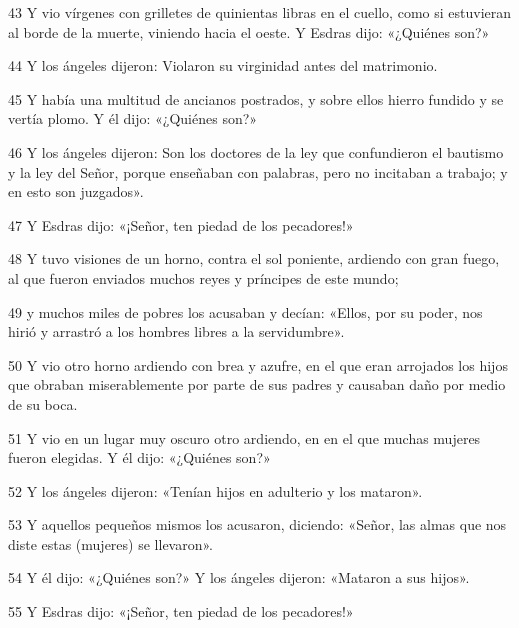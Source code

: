\par 43 Y vio vírgenes con grilletes de quinientas libras en el cuello, como si estuvieran al borde de la muerte, viniendo hacia el oeste. Y Esdras dijo: «¿Quiénes son?»

\par 44 Y los ángeles dijeron: Violaron su virginidad antes del matrimonio.

\par 45 Y había una multitud de ancianos postrados, y sobre ellos hierro fundido y se vertía plomo. Y él dijo: «¿Quiénes son?»

\par 46 Y los ángeles dijeron: Son los doctores de la ley que confundieron el bautismo y la ley del Señor, porque enseñaban con palabras, pero no incitaban a trabajo; y en esto son juzgados».

\par 47 Y Esdras dijo: «¡Señor, ten piedad de los pecadores!»

\par 48 Y tuvo visiones de un horno, contra el sol poniente, ardiendo con gran fuego, al que fueron enviados muchos reyes y príncipes de este mundo;

\par 49 y muchos miles de pobres los acusaban y decían: «Ellos, por su poder, nos hirió y arrastró a los hombres libres a la servidumbre».

\par 50 Y vio otro horno ardiendo con brea y azufre, en el que eran arrojados los hijos que obraban miserablemente por parte de sus padres y causaban daño por medio de su boca.

\par 51 Y vio en un lugar muy oscuro otro ardiendo, en en el que muchas mujeres fueron elegidas. Y él dijo: «¿Quiénes son?»

\par 52 Y los ángeles dijeron: «Tenían hijos en adulterio y los mataron».

\par 53 Y aquellos pequeños mismos los acusaron, diciendo: «Señor, las almas que nos diste estas (mujeres) se llevaron».

\par 54 Y él dijo: «¿Quiénes son?» Y los ángeles dijeron: «Mataron a sus hijos».

\par 55 Y Esdras dijo: «¡Señor, ten piedad de los pecadores!»

